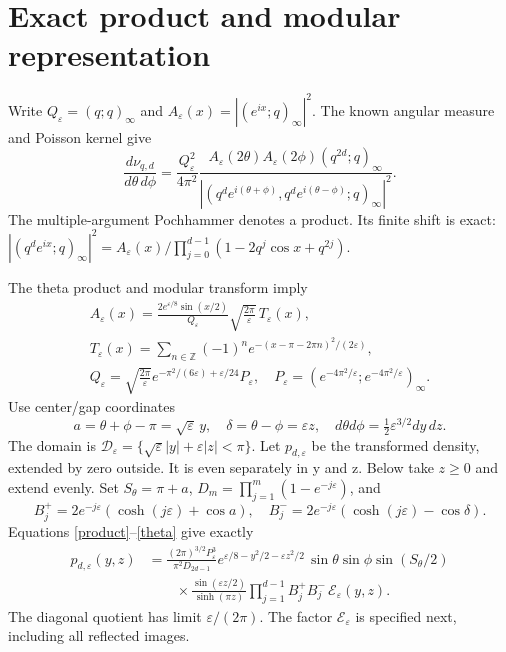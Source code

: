 \documentclass[11pt]{article}
\newcommand{\eps}{\varepsilon}
\begin{document}
\newpage
\section{Exact product and modular representation}
Write $Q_\eps=(q;q)_\infty$ and
$A_\eps(x)=|(e^{ix};q)_\infty|^2$.
The known angular measure and Poisson kernel give
\begin{equation}\label{product}
 \frac{d\nu_{q,d}}{d\theta\,d\phi}
 =\frac{Q_\eps^2}{4\pi^2}
 \frac{A_\eps(2\theta)A_\eps(2\phi)(q^{2d};q)_\infty}
 {|(q^de^{i(\theta+\phi)},q^de^{i(\theta-\phi)};q)_\infty|^2}.
\end{equation}
The multiple-argument Pochhammer denotes a product. Its finite
shift is exact: $|(q^de^{ix};q)_\infty|^2=
A_\eps(x)/\prod_{j=0}^{d-1}(1-2q^j\cos x+q^{2j})$.

The theta product and modular transform \cite{dlmf} imply
\begin{gather}
 A_\eps(x)=\frac{2e^{\eps/8}\sin(x/2)}{Q_\eps}
       \sqrt{\frac{2\pi}{\eps}}\,T_\eps(x),\nonumber\\
 T_\eps(x)=\sum_{n\in\mathbb Z}(-1)^n
       e^{-(x-\pi-2\pi n)^2/(2\eps)},\label{theta}\\
 Q_\eps=\sqrt{\frac{2\pi}{\eps}}
       e^{-\pi^2/(6\eps)+\eps/24}P_\eps,
 \quad P_\eps=(e^{-4\pi^2/\eps};e^{-4\pi^2/\eps})_\infty.\nonumber
\end{gather}
Use center/gap coordinates
\[
 a=\theta+\phi-\pi=\sqrt\eps\,y,\quad
 \delta=\theta-\phi=\eps z,\quad
 d\theta d\phi=\tfrac12\eps^{3/2}dy\,dz.
\]
The domain is $\mathcal D_\eps=\{\sqrt\eps|y|+\eps|z|<\pi\}$.
Let $p_{d,\eps}$ be the transformed density, extended by zero outside.
It is even separately in y and z. Below take $z\ge0$ and extend evenly.
Set $S_\theta=\pi+a$, $D_m=\prod_{j=1}^m(1-e^{-j\eps})$,
and
\[
 B_j^+=2e^{-j\eps}(\cosh(j\eps)+\cos a),\quad
 B_j^-=2e^{-j\eps}(\cosh(j\eps)-\cos\delta).
\]
Equations \eqref{product}--\eqref{theta} give exactly
\begin{align}
 p_{d,\eps}(y,z)&=
 \frac{(2\pi)^{3/2}P_\eps^3}{\pi^2D_{2d-1}}
 e^{\eps/8-y^2/2-\eps z^2/2}\,
 \sin\theta\sin\phi\sin(S_\theta/2)\nonumber\\
 &\qquad\times\frac{\sin(\eps z/2)}{\sinh(\pi z)}
 \prod_{j=1}^{d-1}B_j^+B_j^-\,\mathcal E_\eps(y,z).\label{exact-density}
\end{align}
The diagonal quotient has limit $\eps/(2\pi)$. The factor
$\mathcal E_\eps$ is specified next, including all reflected images.

\newpage
\end{document}
